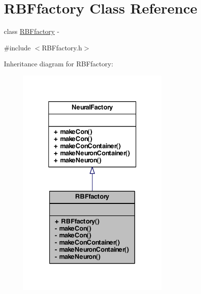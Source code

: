 \hypertarget{class_r_b_ffactory}{
\section{RBFfactory Class Reference}
\label{class_r_b_ffactory}
}


class \hyperlink{class_r_b_ffactory}{RBFfactory} -\/  




{\ttfamily \#include $<$RBFfactory.h$>$}



Inheritance diagram for RBFfactory:
\nopagebreak
\begin{figure}[H]
\begin{center}
\leavevmode
\includegraphics[width=214pt]{class_r_b_ffactory__inherit__graph}
\end{center}
\end{figure}


